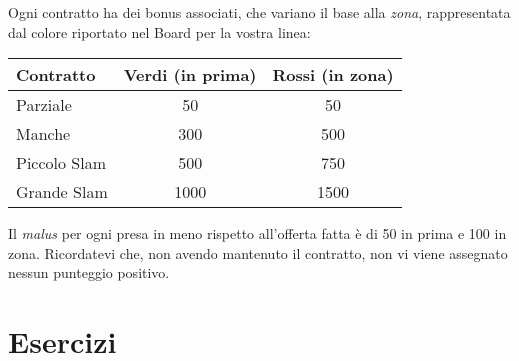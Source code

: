 \documentclass[../corsofiori.tex]{subfiles}
\begin{document}
Ogni contratto ha dei bonus associati, che variano il base alla \emph{zona}, rappresentata dal colore riportato nel
Board per la vostra linea:

\bigskip
\begin{center}
\begin{tabular}{lcc}
    \toprule
    Contratto & Verdi (in prima) & Rossi (in zona)\\
    \midrule
    Parziale & 50 & 50\\
    Manche & 300 & 500\\
    Piccolo Slam & 500 & 750\\
    Grande Slam & 1000 & 1500\\
    \bottomrule
\end{tabular}
\end{center}
\bigskip

Il \emph{malus} per ogni presa in meno rispetto all'offerta fatta è di 50 in prima e 100 in zona. Ricordatevi che, non
avendo mantenuto il contratto, non vi viene assegnato nessun punteggio positivo.


\newpage
\section*{Esercizi}
\end{document}

